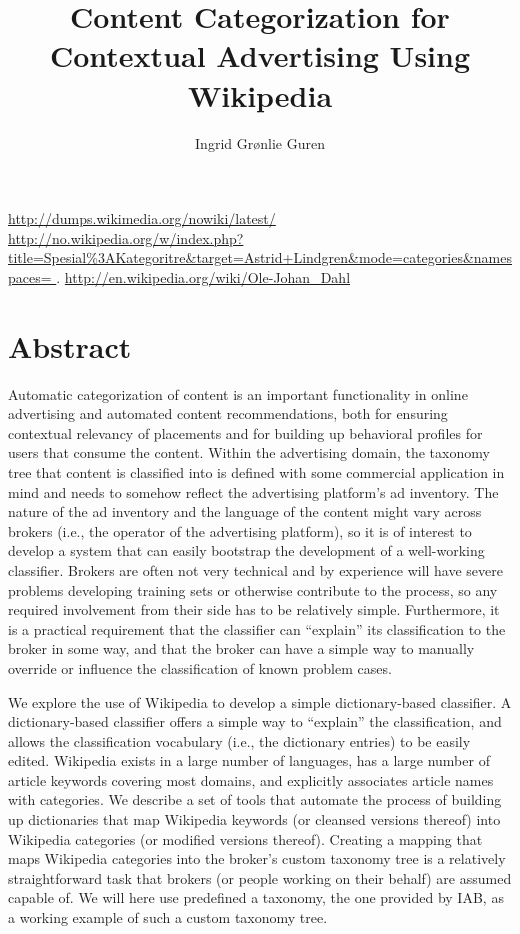 \documentclass[english,a4paper]{ifimaster}
\title{Content Categorization for Contextual Advertising Using Wikipedia}
\author{Ingrid Grønlie Guren}
\begin{document}
\ififorside{}
\frontmatter{}
\maketitle{}


\urldef\nowikidump\url{http://dumps.wikimedia.org/nowiki/latest/}
\urldef\categorytree\url{http://no.wikipedia.org/w/index.php?title=Spesial%3AKategoritre&target=Astrid+Lindgren&mode=categories&namespaces= }.
\urldef\olejohandahleng\url{http://en.wikipedia.org/wiki/Ole-Johan_Dahl}


\chapter*{Abstract}
Automatic categorization of content is an important %
functionality in online advertising and automated content recommendations, both for ensuring contextual relevancy of placements and for building up behavioral profiles for users that consume the content. Within the advertising domain, the taxonomy tree that content is classified into is defined with some commercial application in mind and needs to somehow reflect the advertising platform’s ad inventory. The nature of the ad inventory and the language of the content might vary across brokers (i.e., the operator of the advertising platform), so it is of interest to develop a system that can easily bootstrap the development of a well-working classifier. Brokers are often not very technical and by experience will have severe problems developing training sets or otherwise contribute to the process, so any required involvement from their side has to be relatively simple. Furthermore, it is a practical requirement that the classifier can “explain” its classification to the broker in some way, and that the broker can have a simple way to manually override or influence the classification of known problem cases.

We explore the use of Wikipedia to develop a simple dictionary-based classifier. A dictionary-based classifier offers a simple way to “explain” the classification, and allows the classification vocabulary (i.e., the dictionary entries) to be easily edited. Wikipedia exists in a large number of languages, has a large number of article keywords covering most domains, and explicitly associates article names with categories. We describe a set of tools that automate the process of building up dictionaries that map Wikipedia keywords (or cleansed versions thereof) into Wikipedia categories (or modified versions thereof). Creating a mapping that maps Wikipedia categories into the broker’s custom taxonomy tree is a relatively straightforward task that brokers (or people working on their behalf) are assumed capable of. We will here use predefined a taxonomy, the one provided by IAB, as a working example of such a custom taxonomy tree.
\end{document}
